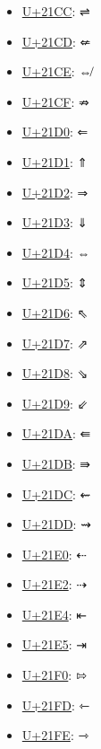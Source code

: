 \begin{itemize}
	\item \href{https://www.compart.com/en/unicode/U+21CC}{U+21CC}: ⇌
	\item \href{https://www.compart.com/en/unicode/U+21CD}{U+21CD}: ⇍
	\item \href{https://www.compart.com/en/unicode/U+21CE}{U+21CE}: ⇎
	\item \href{https://www.compart.com/en/unicode/U+21CF}{U+21CF}: ⇏
	\item \href{https://www.compart.com/en/unicode/U+21D0}{U+21D0}: ⇐
	\item \href{https://www.compart.com/en/unicode/U+21D1}{U+21D1}: ⇑
	\item \href{https://www.compart.com/en/unicode/U+21D2}{U+21D2}: ⇒
	\item \href{https://www.compart.com/en/unicode/U+21D3}{U+21D3}: ⇓
	\item \href{https://www.compart.com/en/unicode/U+21D4}{U+21D4}: ⇔
	\item \href{https://www.compart.com/en/unicode/U+21D5}{U+21D5}: ⇕
	\item \href{https://www.compart.com/en/unicode/U+21D6}{U+21D6}: ⇖
	\item \href{https://www.compart.com/en/unicode/U+21D7}{U+21D7}: ⇗
	\item \href{https://www.compart.com/en/unicode/U+21D8}{U+21D8}: ⇘
	\item \href{https://www.compart.com/en/unicode/U+21D9}{U+21D9}: ⇙
	\item \href{https://www.compart.com/en/unicode/U+21DA}{U+21DA}: ⇚
	\item \href{https://www.compart.com/en/unicode/U+21DB}{U+21DB}: ⇛
	\item \href{https://www.compart.com/en/unicode/U+21DC}{U+21DC}: ⇜
	\item \href{https://www.compart.com/en/unicode/U+21DD}{U+21DD}: ⇝
	\item \href{https://www.compart.com/en/unicode/U+21E0}{U+21E0}: ⇠
	\item \href{https://www.compart.com/en/unicode/U+21E2}{U+21E2}: ⇢
	\item \href{https://www.compart.com/en/unicode/U+21E4}{U+21E4}: ⇤
	\item \href{https://www.compart.com/en/unicode/U+21E5}{U+21E5}: ⇥
	\item \href{https://www.compart.com/en/unicode/U+21F0}{U+21F0}: ⇰
	\item \href{https://www.compart.com/en/unicode/U+21FD}{U+21FD}: ⇽
	\item \href{https://www.compart.com/en/unicode/U+21FE}{U+21FE}: ⇾

\end{itemize}
